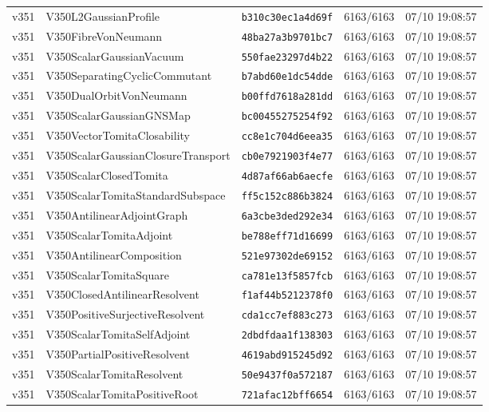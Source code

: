 \documentclass[11pt]{article}
\theoremstyle{definition}\newtheorem{deriv}{Derivation}
\begin{document}
{\begin{longtable}{@{}lllll@{}}
v351 & V350L2GaussianProfile & \texttt{b310c30ec1a4d69f} & 6163/6163 & 07/10 19:08:57 \\
v351 & V350FibreVonNeumann & \texttt{48ba27a3b9701bc7} & 6163/6163 & 07/10 19:08:57 \\
v351 & V350ScalarGaussianVacuum & \texttt{550fae23297d4b22} & 6163/6163 & 07/10 19:08:57 \\
v351 & V350SeparatingCyclicCommutant & \texttt{b7abd60e1dc54dde} & 6163/6163 & 07/10 19:08:57 \\
v351 & V350DualOrbitVonNeumann & \texttt{b00ffd7618a281dd} & 6163/6163 & 07/10 19:08:57 \\
v351 & V350ScalarGaussianGNSMap & \texttt{bc00455275254f92} & 6163/6163 & 07/10 19:08:57 \\
v351 & V350VectorTomitaClosability & \texttt{cc8e1c704d6eea35} & 6163/6163 & 07/10 19:08:57 \\
v351 & V350ScalarGaussianClosureTransport & \texttt{cb0e7921903f4e77} & 6163/6163 & 07/10 19:08:57 \\
v351 & V350ScalarClosedTomita & \texttt{4d87af66ab6aecfe} & 6163/6163 & 07/10 19:08:57 \\
v351 & V350ScalarTomitaStandardSubspace & \texttt{ff5c152c886b3824} & 6163/6163 & 07/10 19:08:57 \\
v351 & V350AntilinearAdjointGraph & \texttt{6a3cbe3ded292e34} & 6163/6163 & 07/10 19:08:57 \\
v351 & V350ScalarTomitaAdjoint & \texttt{be788eff71d16699} & 6163/6163 & 07/10 19:08:57 \\
v351 & V350AntilinearComposition & \texttt{521e97302de69152} & 6163/6163 & 07/10 19:08:57 \\
v351 & V350ScalarTomitaSquare & \texttt{ca781e13f5857fcb} & 6163/6163 & 07/10 19:08:57 \\
v351 & V350ClosedAntilinearResolvent & \texttt{f1af44b5212378f0} & 6163/6163 & 07/10 19:08:57 \\
v351 & V350PositiveSurjectiveResolvent & \texttt{cda1cc7ef883c273} & 6163/6163 & 07/10 19:08:57 \\
v351 & V350ScalarTomitaSelfAdjoint & \texttt{2dbdfdaa1f138303} & 6163/6163 & 07/10 19:08:57 \\
v351 & V350PartialPositiveResolvent & \texttt{4619abd915245d92} & 6163/6163 & 07/10 19:08:57 \\
v351 & V350ScalarTomitaResolvent & \texttt{50e9437f0a572187} & 6163/6163 & 07/10 19:08:57 \\
v351 & V350ScalarTomitaPositiveRoot & \texttt{721afac12bff6654} & 6163/6163 & 07/10 19:08:57 \\

\end{longtable}}
\end{document}
